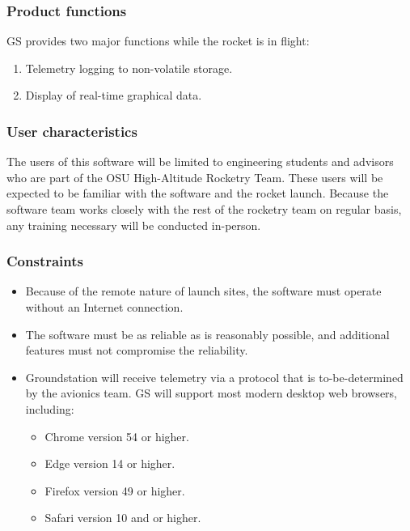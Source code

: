 \documentclass[10pt,draftclsnofoot,onecolumn]{IEEEtran}
\begin{document}
	\subsubsection{Product functions}
	GS provides two major functions while the rocket is in flight:

	\begin{enumerate}
		\item Telemetry logging to non-volatile storage.
		\item Display of real-time graphical data.
	\end{enumerate}

	\subsubsection{User characteristics}
	The users of this software will be limited to engineering students and advisors who are part of the OSU High-Altitude
	Rocketry Team.
	These users will be expected to be familiar with the software and the rocket launch.
	Because the software team works closely with the rest of the rocketry team on regular basis,
	any training necessary will be conducted in-person.

	\subsubsection{Constraints}
	\begin{itemize}
		\item Because of the remote nature of launch sites, the software must operate without an Internet connection.
		\item The software must be as reliable as is reasonably possible, and additional features must not compromise the reliability.
		\item Groundstation will receive telemetry via a protocol that is to-be-determined by the avionics team.
	GS will support most modern desktop web browsers, including:
	\begin{itemize}
			\item Chrome version 54 or higher.
			\item Edge version 14 or higher.
			\item Firefox version 49 or higher.
			\item Safari version 10 and or higher.
		\end{itemize}

	\end{itemize}
\end{document}

